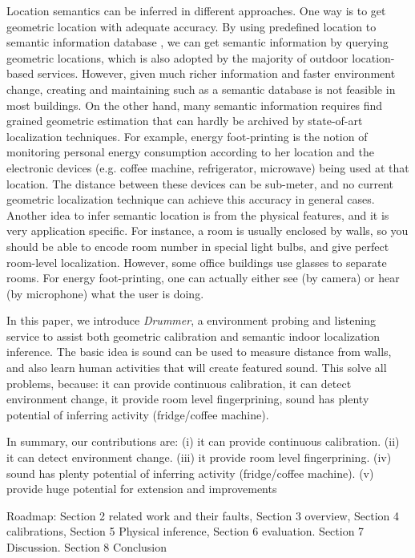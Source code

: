Location semantics can be inferred in different approaches. One way is to get geometric location with 
adequate accuracy. By using predefined location to semantic information database \fxnote{[cite]}, we can get semantic information
by querying geometric locations, which is also adopted by the majority of outdoor location-based services.
However, given much richer information and faster environment change, creating and maintaining such as a
semantic database is not feasible in most buildings. On the other hand, many semantic information requires
find grained geometric estimation that can hardly be archived by state-of-art localization techniques. For 
example, energy foot-printing \fxnote{[cite]} is the notion of monitoring personal energy consumption
according to her location and 
the electronic devices (e.g. coffee machine, refrigerator, microwave) being used at that location. The 
distance between these devices can be sub-meter, and no current geometric localization technique can achieve this 
accuracy in general cases. Another idea to infer semantic location is from the physical features, and it is very application
specific. For instance, a room is usually enclosed by walls, so you should be able to encode room number in 
special light bulbs, and give perfect room-level localization. However, some office buildings use glasses to separate
rooms. %
For energy foot-printing, one can actually either see (by camera) or hear (by microphone) what the user is doing.



In this paper, we introduce {\em Drummer}, a environment probing and listening service 
to assist both geometric calibration and semantic indoor localization inference. The basic idea is sound 
can be used to measure distance from walls, and also learn human activities that will create featured sound.
This solve all problems, because: it can 
provide continuous calibration, it can detect environment change, 
it provide room level fingerprining, sound has plenty potential of inferring activity (fridge/coffee machine).


In summary, our contributions are: (i) it can provide continuous calibration. (ii) it can detect environment change. 
(iii) it provide room level fingerprining. (iv) sound has plenty potential of inferring activity (fridge/coffee machine).
(v) provide huge potential for extension and improvements

Roadmap: Section 2 related work and their faults, Section 3 overview, Section 4 calibrations, Section 5 Physical inference, 
Section 6 evaluation. Section 7 Discussion. Section 8 Conclusion

